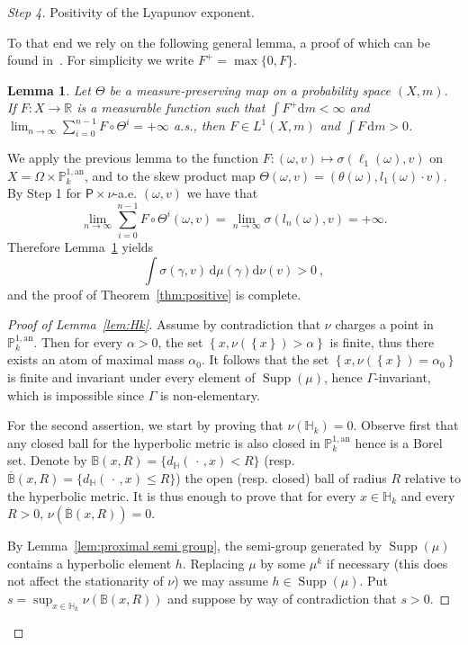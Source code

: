 \documentclass[10pt]{amsart}
\newtheorem{lemm}[theo]{Lemma}\newtheorem{prop}[theo]{Proposition}\newtheorem{coro}[theo]{Corollary}\newtheorem{conj}[theo]{Conjecture}
\theoremstyle{definition}\newtheorem{defi}[theo]{Definition}\newtheorem{rema}[theo]{Remark}\newtheorem{exam}[theo]{Example}\newtheorem{exem}[theo]{Example}\newtheorem{nota}[theo]{Notation}
\DeclareMathOperator{\supp}{Supp}
\newcommand{\re}{\mathbb{R}}
\newcommand{\hh}{\mathbb{H}}
\newcommand{\prob}{\mathsf{P}}
\newcommand{\B}{\mathbb{B}}
\newcommand{\an}{\mathrm{an}}
\newcommand{\cv}{\rightarrow}
\newcommand{\om}{\Omega}
\newcommand{\set}[1]{\left\{#1\right\}}
\newcommand{\PP}{\mathbb{P}}
\newcommand{\berk}{{\mathbb{P}^{1, \mathrm{an}}_k}}
\newcommand*{\dd}{\mathrm{d}}
\newcommand*{\dm}{\dd m}
\newcommand*{\dmu}{\dd \mu}
\newcommand*{\dnu}{\dd \nu}
\newenvironment{step}{\begin{proof}}{\let\qed\relax \end{proof}}
\begin{document}
\begin{step}[Step 4]
Positivity of the Lyapunov exponent.

To that end we rely on the following general lemma, a proof of which can be found in~\cite[Lem.~2.3, p.~22]{bougerol-lacroix}. For simplicity we write $F^+ = \max \{ 0, F\}$.

\begin{lemm}\label{lem:birkhoff}
Let $\Theta$ be a measure-preserving map on a probability space $(X, m)$. If $F:X\to \re$ is a measurable function such that $\int F^+ \dm <\infty$ and $\lim_{n\cv\infty} \sum_{i=0}^{n-1} F\circ \Theta^i = +\infty $ a.s., then $F\in L^1(X,m)$ and $\int F \,\dm >0$.
\end{lemm}

We apply the previous lemma to the function $F: (\omega, v) \mapsto \sigma(\ell_1(\omega), v)$ on $X=\om\times \berk$, and to the skew product map $\Theta(\omega,v) = (\theta(\omega), l_1(\omega) \cdot v)$. By Step 1 for $\prob\times \nu$-a.e. $(\omega,v)$ we have that
\[
\lim_{n\cv\infty} \sum_{i=0}^{n-1} F\circ \Theta^i (\omega,v) = \lim_{n\cv\infty} \sigma(l_n(\omega),v) = +\infty.
\]
Therefore Lemma~\ref{lem:birkhoff} yields
\begin{equation}\label{eqL}
\int \sigma(\gamma, v)\, \dmu(\gamma)\dnu(v) >0~,
\end{equation}
and the proof of Theorem~\ref{thm:positive} is complete.

\begin{proof}[Proof of Lemma~\ref{lem:Hk}]
Assume by contradiction that $\nu$ charges a point in $\PP^{1,\an}_k$. Then for every $\alpha>0$, the set $\set{x, \nu(\set{x})>\alpha}$ is finite, thus there exists an atom of maximal mass $\alpha_0$. It follows that the set $\set {x, \nu(\set{x})=\alpha_0}$ is finite and invariant under every element of $\supp(\mu)$, hence $\Gamma$-invariant, which is impossible since $\Gamma$ is non-elementary.

For the second assertion, we start by proving that $\nu(\hh_k) =0$. Observe first that any closed ball for the hyperbolic metric is also closed in $\PP^{1,\an}_k$ hence is a Borel set. Denote by $\B(x,R) = \{ d_{\hh}({\,\cdot\,}, x) < R\}$ (resp. $\overline{\B}(x,R) = \{ d_{\hh}({\,\cdot\,}, x) \le R\}$) the open (resp. closed) ball of radius $R$ relative to the hyperbolic metric. It is thus enough to prove that for every $x\in \hh_k$ and every $R>0$, $\nu(\overline{\B}(x,R)) = 0$.

By Lemma~\ref{lem:proximal semi group}, the semi-group generated by $\supp(\mu)$ contains a hyperbolic element $h$. Replacing $\mu$ by some $\mu^k$ if necessary (this does not affect the stationarity of $\nu$) we may assume $h\in \supp(\mu)$. Put $s= \sup_{x\in \hh_k} \nu(\B(x,R))$ and suppose by way of contradiction that $s>0$.


\end{proof}
\end{step}
\end{document}
